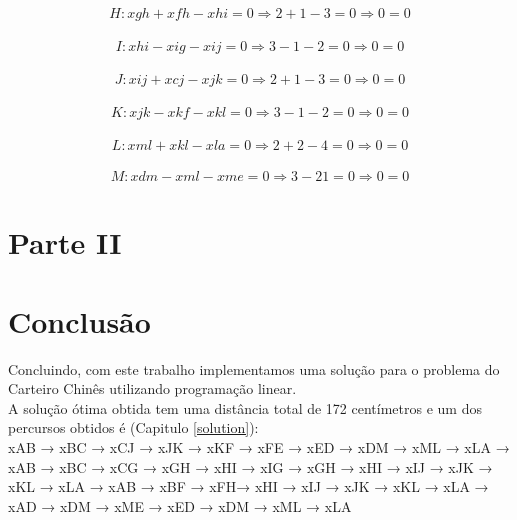 \documentclass[a4paper]{report}
\begin{document}
\begin{multline}
H: xgh + xfh - xhi = 0
\Rightarrow 2 + 1 - 3 = 0
\Rightarrow 0 = 0
\end{multline}

\begin{multline}
I: xhi - xig - xij = 0
\Rightarrow 3 - 1 - 2 = 0
\Rightarrow 0 = 0
\end{multline}

\begin{multline}
J: xij + xcj - xjk = 0
\Rightarrow 2 + 1 - 3 = 0
\Rightarrow 0 = 0
\end{multline}

\begin{multline}
K: xjk - xkf - xkl = 0
\Rightarrow 3 - 1 - 2 = 0
\Rightarrow 0 = 0
\end{multline}

\begin{multline}
L: xml + xkl - xla = 0
\Rightarrow 2 + 2 - 4 = 0
\Rightarrow 0 = 0
\end{multline}

\begin{multline}
M: xdm - xml - xme = 0
\Rightarrow 3 - 2 1 = 0
\Rightarrow 0 = 0
\end{multline}


\chapter{Parte II}



\chapter{Conclusão}
Concluindo, com este trabalho implementamos uma solução para o problema do
Carteiro Chinês utilizando programação linear.\\
A solução ótima obtida tem uma distância total de 172 centímetros e um dos
percursos obtidos é (Capitulo \ref{solution}):\\
xAB → xBC → xCJ → xJK → xKF → xFE → xED → xDM → xML → xLA →
xAB → xBC → xCG → xGH → xHI  → xIG → xGH → xHI → xIJ → xJK  → xKL  → xLA →
xAB → xBF → xFH→ xHI  → xIJ → xJK  → xKL  → xLA →
xAD → xDM → xME → xED  → xDM → xML → xLA\\
\end{document}
